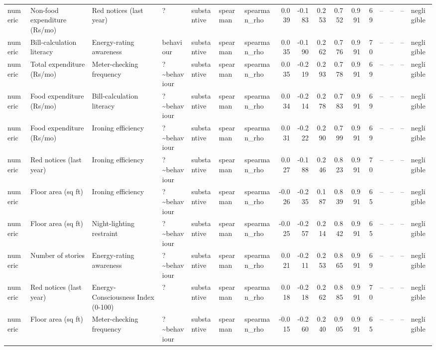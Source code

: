 \begin{table}
\begin{tabular}{lllllllrrrrrrrrrl}
numeric & Non-food expenditure (Rs/mo) & Red notices (last year) & ? & substantive & spearman & spearman\_rho & 0.039 & -0.183 & 0.253 & 0.752 & 0.991 & 69 & -- & -- & -- & negligible \\
numeric & Bill-calculation literacy & Energy-rating awareness & behaviour & substantive & spearman & spearman\_rho & 0.035 & -0.190 & 0.262 & 0.776 & 0.991 & 70 & -- & -- & -- & negligible \\
numeric & Total expenditure (Rs/mo) & Meter-checking frequency & ?\textasciitilde behaviour & substantive & spearman & spearman\_rho & 0.035 & -0.219 & 0.293 & 0.778 & 0.991 & 69 & -- & -- & -- & negligible \\
numeric & Food expenditure (Rs/mo) & Bill-calculation literacy & ?\textasciitilde behaviour & substantive & spearman & spearman\_rho & 0.034 & -0.214 & 0.278 & 0.783 & 0.991 & 69 & -- & -- & -- & negligible \\
numeric & Food expenditure (Rs/mo) & Ironing efficiency & ?\textasciitilde behaviour & substantive & spearman & spearman\_rho & 0.031 & -0.222 & 0.290 & 0.799 & 0.991 & 69 & -- & -- & -- & negligible \\
numeric & Red notices (last year) & Ironing efficiency & ?\textasciitilde behaviour & substantive & spearman & spearman\_rho & 0.027 & -0.188 & 0.246 & 0.823 & 0.991 & 70 & -- & -- & -- & negligible \\
numeric & Floor area (sq ft) & Ironing efficiency & ?\textasciitilde behaviour & substantive & spearman & spearman\_rho & -0.026 & -0.235 & 0.187 & 0.839 & 0.991 & 65 & -- & -- & -- & negligible \\
numeric & Floor area (sq ft) & Night-lighting restraint & ?\textasciitilde behaviour & substantive & spearman & spearman\_rho & -0.025 & -0.257 & 0.214 & 0.842 & 0.991 & 65 & -- & -- & -- & negligible \\
numeric & Number of stories & Energy-rating awareness & ?\textasciitilde behaviour & substantive & spearman & spearman\_rho & 0.021 & -0.211 & 0.253 & 0.865 & 0.991 & 69 & -- & -- & -- & negligible \\
numeric & Red notices (last year) & Energy-Consciousness Index (0-100) & ? & substantive & spearman & spearman\_rho & 0.018 & -0.218 & 0.262 & 0.885 & 0.991 & 70 & -- & -- & -- & negligible \\
numeric & Floor area (sq ft) & Meter-checking frequency & ?\textasciitilde behaviour & substantive & spearman & spearman\_rho & -0.015 & -0.260 & 0.240 & 0.905 & 0.991 & 65 & -- & -- & -- & negligible \\

\end{tabular}
\end{table}
